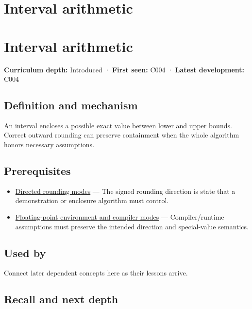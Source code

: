 \hypertarget{appendix-1823a14330cb}{}
\section*{Interval arithmetic}
\section{Interval arithmetic}\label{appendix-1823a14330cb-interval-arithmetic}

\textbf{Curriculum depth:} Introduced · \textbf{First seen:} C004 · \textbf{Latest development:} C004

\subsection{Definition and mechanism}\label{appendix-1823a14330cb-definition-and-mechanism}

An interval encloses a possible exact value between lower and upper bounds. Correct outward rounding can preserve containment when the whole algorithm honors necessary assumptions.

\subsection{Prerequisites}\label{appendix-1823a14330cb-prerequisites}

\begin{itemize}
\tightlist
\item
  \hyperref[appendix-637d164ae5ca]{Directed rounding modes} --- The signed rounding direction is state that a demonstration or enclosure algorithm must control.
\item
  \hyperref[appendix-f11d1a521253]{Floating-point environment and compiler modes} --- Compiler/runtime assumptions must preserve the intended direction and special-value semantics.
\end{itemize}

\subsection{Used by}\label{appendix-1823a14330cb-used-by}

Connect later dependent concepts here as their lessons arrive.

\subsection{Recall and next depth}\label{appendix-1823a14330cb-recall-and-next-depth}

